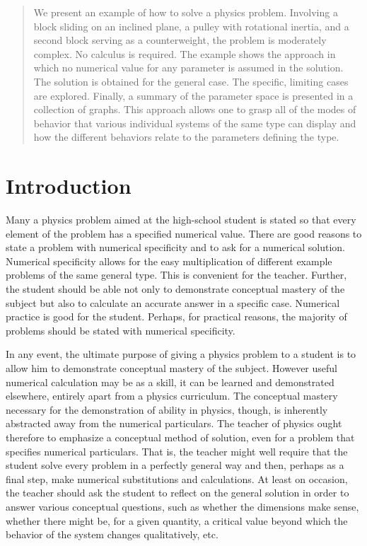 \documentclass[twocolumn]{article}
\begin{document}
\thispagestyle{fancy}

\begin{abstract}

   We present an example of how to solve a physics problem.  Involving a block
   sliding on an inclined plane, a pulley with rotational inertia, and a second
   block serving as a counterweight, the problem is moderately complex.  No
   calculus is required.  The example shows the approach in which no numerical
   value for any parameter is assumed in the solution.  The solution is
   obtained for the general case.  The specific, limiting cases are explored.
   Finally, a summary of the parameter space is presented in a collection of
   graphs.  This approach allows one to grasp all of the modes of behavior that
   various individual systems of the same type can display and how the
   different behaviors relate to the parameters defining the type.

\end{abstract}

\section{Introduction}

Many a physics problem aimed at the high-school student is stated so that every
element of the problem has a specified numerical value.  There are good reasons
to state a problem with numerical specificity and to ask for a numerical
solution.  Numerical specificity allows for the easy multiplication of
different example problems of the same general type.  This is convenient for
the teacher.  Further, the student should be able not only to demonstrate
conceptual mastery of the subject but also to calculate an accurate answer in a
specific case.  Numerical practice is good for the student.  Perhaps, for
practical reasons, the majority of problems should be stated with numerical
specificity.

In any event, the ultimate purpose of giving a physics problem to a student is
to allow him to demonstrate conceptual mastery of the subject.  However useful
numerical calculation may be as a skill, it can be learned and demonstrated
elsewhere, entirely apart from a physics curriculum.  The conceptual mastery
necessary for the demonstration of ability in physics, though, is inherently
abstracted away from the numerical particulars.  The teacher of physics ought
therefore to emphasize a conceptual method of solution, even for a problem that
specifies numerical particulars. That is, the teacher might well require that
the student solve every problem in a perfectly general way and then, perhaps as
a final step, make numerical substitutions and calculations. At least on
occasion, the teacher should ask the student to reflect on the general solution
in order to answer various conceptual questions, such as whether the dimensions
make sense, whether there might be, for a given quantity, a critical value
beyond which the behavior of the system changes qualitatively, etc.
\end{document}
